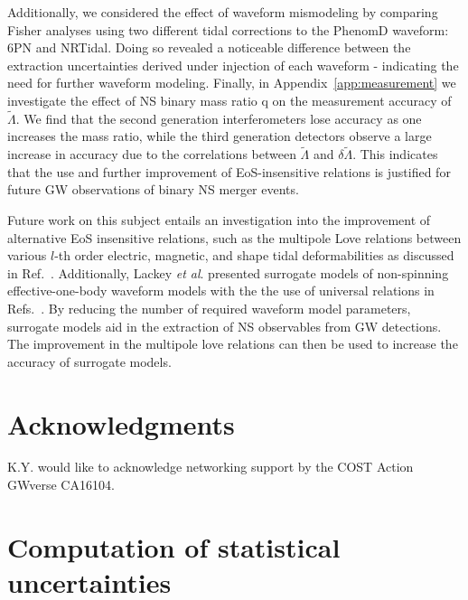 \documentclass[prd,twocolumn,nofootinbib,superscriptaddress,amsmath,amssymb]{revtex4-1}
\begin{document}
Additionally, we considered the effect of waveform mismodeling by comparing Fisher analyses using two different tidal corrections to the PhenomD waveform: 6PN and NRTidal.
Doing so revealed a noticeable difference between the extraction uncertainties derived under injection of each waveform - indicating the need for further waveform modeling.
Finally, in Appendix~\ref{app:measurement} we investigate the effect of NS binary mass ratio q on the measurement accuracy of $\tilde\Lambda$.
We find that the second generation interferometers lose accuracy as one increases the mass ratio, while the third generation detectors observe a large increase in accuracy due to the correlations between $\tilde\Lambda$ and $\delta\tilde\Lambda$.
This indicates that the use and further improvement of EoS-insensitive relations is justified for future GW observations of binary NS merger events.

Future work on this subject entails an investigation into the improvement of alternative EoS insensitive relations, such as the multipole Love relations between various $l$-th order electric, magnetic, and shape tidal deformabilities as discussed in Ref.~\cite{Yagi:Multipole}.
Additionally, Lackey \emph{et al}. presented surrogate models of non-spinning effective-one-body waveform models with the the use of universal relations in Refs.~\cite{Lackey:Surrogate, Lackey:EOB}.
By reducing the number of required waveform model parameters, surrogate models aid in the extraction of NS observables from GW detections.
The improvement in the multipole love relations can then be used to increase the accuracy of surrogate models.

\section*{Acknowledgments}\label{acknowledgments}
K.Y. would like to acknowledge networking support by the COST Action GWverse CA16104.

\appendix
\section{Computation of statistical uncertainties}\label{app:stackingProcedure}
\end{document}
